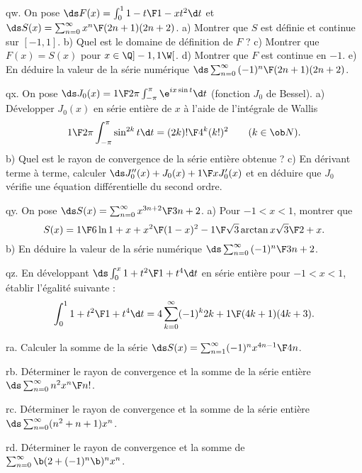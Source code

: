 \exo [Level=2,Fight=0,Learn=0,Type=\Exercices,Field=\SériesEntières,Origin=] qw. 
On pose $\ds F(x)=\int_0^1{1-t\F 1-xt^2}\d t$ et $\ds S(x)=\sum_{n=0}^\infty{x^n\F(2n+1)(2n+2)}$. \pn
a) Montrer que $S$ est définie et continue sur $[-1,1]$. \pn
b) Quel est le domaine de définition de $F$ ?\pn
c) Montrer que $F(x)=S(x)$ pour $x\in\Q]-1,1\W[$. \pn
d) Montrer que $F$ est continue en $-1$. \pn
e) En déduire la valeur de la série numérique $\ds\sum_{n=0}^\infty{(-1)^n\F(2n+1)(2n+2)}$. 

\exo [Level=2,Fight=2,Learn=2,Field=\FonctionsDéfiniesParUneIntégrale|\SériesEntières,Type=\Exercices,Origin=] qx. 
On pose $\ds J_0(x)={1\F2\pi}\int_{-\pi}^\pi\e^{ix\sin t}\d t$ (fonction $J_0$ de Bessel). \pn
a) Développer $J_0(x)$ en série entière de $x$ à l'aide de l'intégrale de Wallis
$$
{1\F2\pi}\int_{-\pi}^\pi\sin^{2k}t\d t={(2k)!\F4^k(k!)^2}\qquad(k\in\ob N).
$$
b) Quel est le rayon de convergence de la série entière obtenue ?\pn
c) En dérivant terme à terme, calculer $\ds J_0''(x)+J_0(x)+{1\F x}J_0'(x)$ et en déduire 
que $J_0$ vérifie une équation différentielle du second ordre. 

\exo [Level=2,Fight=0,Learn=0,Type=\Exercices,Field=\SériesEntières,Origin=] qy. 
On pose $\ds S(x)=\sum_{n=0}^\infty{x^{3n+2}\F 3n+2}$. \pn
a) Pour $-1<x<1$, montrer que 
$$
S(x)={1\F6}\ln{1+x+x^2\F(1-x)^2}-{1\F\sqrt3}\arctan{x\sqrt3\F2+x}.
$$
b) En déduire la valeur de la série numérique $\ds\sum_{n=0}^\infty{(-1)^n\F3n+2}$. 

\exo [Level=2,Fight=0,Learn=0,Type=\Exercices,Field=\SériesEntières,Origin=] qz. 
En développant $\ds\int_0^x{1+t^2\F1+t^4}\d t$ en série entière pour $-1<x<1$, 
établir l'égalité suivante : 
$$
\int_0^1{1+t^2\F1+t^4}\d t=4\sum_{k=0}^\infty(-1)^k{2k+1\F(4k+1)(4k+3)}. 
$$

\exo [Level=2,Fight=0,Learn=0,Type=\Exercices,Field=\SériesEntières,Origin=] ra. 
Calculer la somme de la série $\ds S(x)=\sum_{n=1}^\infty(-1)^n{x^{4n-1}\F4n}$. 

\exo [Level=2,Fight=0,Learn=0,Type=\Exercices,Field=\SériesEntières,Origin=] rb. 
Déterminer le rayon de convergence et la somme 
de la série entière $\ds\sum_{n=0}^\infty n^2{x^n\F n!}$. 

\exo [Level=2,Fight=0,Learn=0,Type=\Exercices,Field=\SériesEntières,Origin=] rc. 
Déterminer le rayon de convergence et la somme 
de la série entière $\ds\sum_{n=0}^\infty(n^2+n+1)x^n$. 

\exo [Level=2,Fight=0,Learn=0,Type=\Exercices,Field=\SériesEntières,Origin=] rd. 
Déterminer le rayon de convergence et 
la somme de $\sum_{n=0}^\infty\b(2+(-1)^n\b)^nx^n$. 

